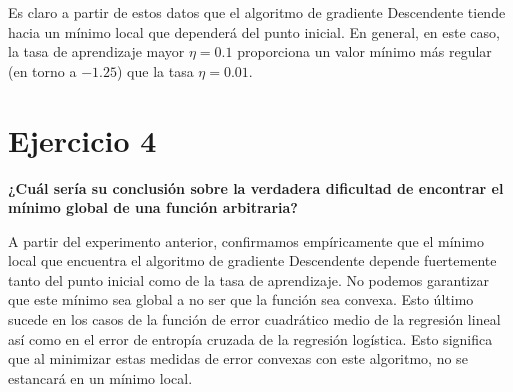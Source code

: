 Es claro a partir de estos datos que el algoritmo de gradiente Descendente tiende
hacia un mínimo local que dependerá del punto inicial. En general, en este caso,
la tasa de aprendizaje mayor $\eta=0.1$ proporciona un valor mínimo más regular
(en torno a $-1.25$) que la tasa $\eta=0.01$. 

\section{Ejercicio 4}

\textbf{¿Cuál sería su conclusión sobre la verdadera dificultad de encontrar el mínimo
global de una función arbitraria?}

A partir del experimento anterior, confirmamos empíricamente que el mínimo local
que encuentra el algoritmo de gradiente Descendente depende fuertemente tanto
del punto inicial como de la tasa de aprendizaje. No podemos garantizar que este
mínimo sea global a no ser que la función sea convexa. Esto último sucede en los casos
de la función de error cuadrático medio de la regresión lineal así como en el 
error de entropía cruzada de la regresión logística. 
Esto significa que al minimizar estas medidas de error convexas con este
algoritmo, no se estancará en un mínimo local.